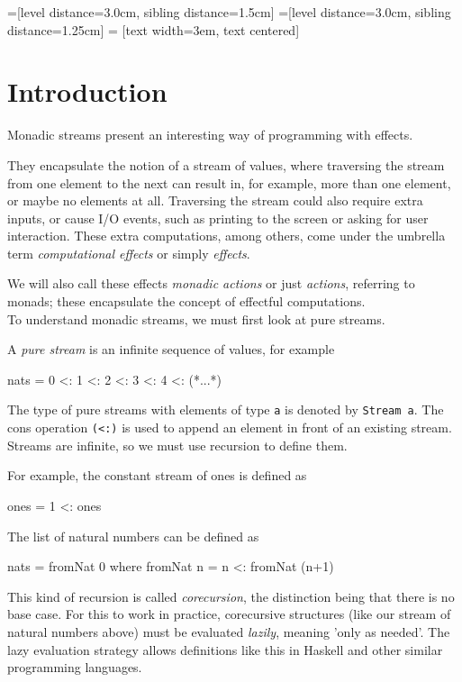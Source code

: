 =[level distance=3.0cm, sibling distance=1.5cm]
=[level distance=3.0cm, sibling distance=1.25cm]
 = [text width=3em, text centered]

\section{Introduction}

Monadic streams present an interesting way of programming with effects. 

They encapsulate the notion of a stream of values, where traversing the stream from one element to the next can result in, for example, more than one element, or maybe no elements at all. Traversing the stream could also require extra inputs, or cause I/O events, such as printing to the screen or asking for user interaction. These extra computations, among others, come under the umbrella term \emph{computational effects} or simply \emph{effects}. 

We will also call these effects \emph{monadic actions} or just \emph{actions}, referring to monads; these encapsulate the concept of effectful computations. \\

To understand monadic streams, we must first look at pure streams.

A \emph{pure stream} is an infinite sequence of values, for example
\begin{haskell}
  nats = 0 <: 1 <: 2 <: 3 <: 4 <: (*...*)
\end{haskell}
The type of pure streams with elements of type \verb+a+ is denoted by \verb+Stream a+. The cons operation \verb+(<:)+ is used to append an element in front of an existing stream. Streams are infinite, so we must use recursion to define them.

For example, the constant stream of ones is defined as
\begin{haskell}
  ones = 1 <: ones
\end{haskell}

The list of natural numbers can be defined as
\begin{haskell}
  nats = fromNat 0
    where fromNat n = n <: fromNat (n+1)
\end{haskell}

This kind of recursion is called \emph{corecursion}, the distinction being that there is no base case. For this to work in practice, corecursive structures (like our stream of natural numbers above) must be evaluated \emph{lazily}, meaning 'only as needed'. The lazy evaluation strategy allows definitions like this in Haskell and other similar programming languages. \\
  
